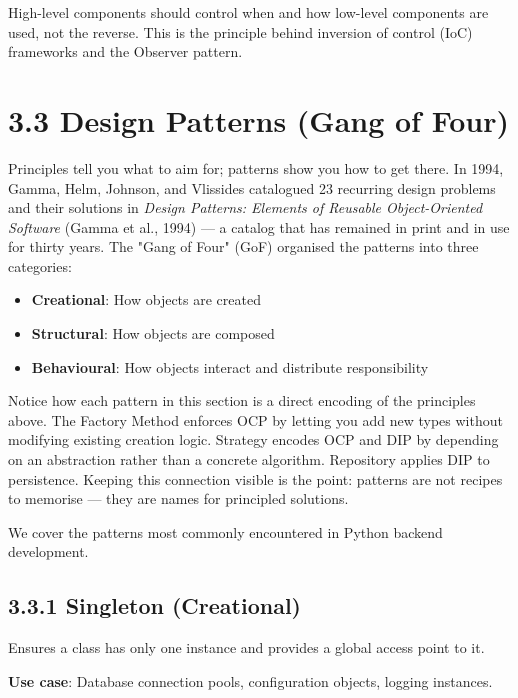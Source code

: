 \documentclass[11pt,a4paper]{book}
\begin{document}
High-level components should control when and how low-level components are used, not the reverse. This is the principle behind inversion of control (IoC) frameworks and the Observer pattern.

\medskip

\section{3.3 Design Patterns (Gang of Four)}

Principles tell you what to aim for; patterns show you how to get there. In 1994, Gamma, Helm, Johnson, and Vlissides catalogued 23 recurring design problems and their solutions in \textit{Design Patterns: Elements of Reusable Object-Oriented Software} (Gamma et al., 1994) --- a catalog that has remained in print and in use for thirty years. The "Gang of Four" (GoF) organised the patterns into three categories:

\begin{itemize}
  \item \textbf{Creational}: How objects are created
  \item \textbf{Structural}: How objects are composed
  \item \textbf{Behavioural}: How objects interact and distribute responsibility
\end{itemize}

Notice how each pattern in this section is a direct encoding of the principles above. The Factory Method enforces OCP by letting you add new types without modifying existing creation logic. Strategy encodes OCP and DIP by depending on an abstraction rather than a concrete algorithm. Repository applies DIP to persistence. Keeping this connection visible is the point: patterns are not recipes to memorise --- they are names for principled solutions.

We cover the patterns most commonly encountered in Python backend development.

\subsection{3.3.1 Singleton (Creational)}

Ensures a class has only one instance and provides a global access point to it.

\textbf{Use case}: Database connection pools, configuration objects, logging instances.
\end{document}
